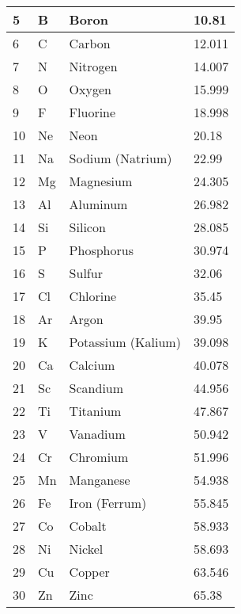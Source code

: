 \documentclass{article}
\begin{document}
\begin{center}
\begin{longtable}{|l|l|l|l|}
 \hline
    5 & B & \cellcolor{metalloid}Boron & 10.81\\
 \hline
    6 & C &\cellcolor{rnmgreen}Carbon & 12.011\\
 \hline
    7 & N &\cellcolor{rnmgreen}Nitrogen & 14.007\\
 \hline
    8 & O &\cellcolor{rnmgreen}Oxygen & 15.999\\
 \hline
    9 & F &\cellcolor{rnmgreen}Fluorine & 18.998\\
 \hline
    10 & Ne &\cellcolor{noblepink}Neon & 20.18\\
 \hline
 \hline
    11 & Na & \cellcolor{alkalibeige}Sodium (Natrium) & 22.99\\
 \hline
    12 & Mg &\cellcolor{alkalineyellow}Magnesium & 24.305\\
 \hline
    13 & Al & \cellcolor{postblue}Aluminum & 26.982\\
 \hline
    14 & Si & \cellcolor{metalloid}Silicon & 28.085\\
 \hline
    15 & P & \cellcolor{rnmgreen}Phosphorus & 30.974\\
 \hline
    16 & S & \cellcolor{rnmgreen}Sulfur & 32.06\\
 \hline
    17 & Cl & \cellcolor{rnmgreen}Chlorine & 35.45\\
 \hline
    18 & Ar &\cellcolor{noblepink}Argon & 39.95\\
 \hline
 \hline
    19 & K & \cellcolor{alkalibeige}Potassium (Kalium) & 39.098\\
 \hline
    20 & Ca & \cellcolor{alkalineyellow}Calcium & 40.078\\
 \hline
    21 & Sc & \cellcolor{transred}Scandium & 44.956\\
 \hline
    22 & Ti & \cellcolor{transred}Titanium & 47.867\\
 \hline
    23 & V & \cellcolor{transred}Vanadium & 50.942\\
 \hline
    24 & Cr & \cellcolor{transred}Chromium & 51.996\\
 \hline
    25 & Mn & \cellcolor{transred}Manganese & 54.938\\
 \hline
    26 & Fe & \cellcolor{transred}Iron (Ferrum) & 55.845\\
 \hline
    27 & Co & \cellcolor{transred}Cobalt & 58.933\\
 \hline
    28 & Ni & \cellcolor{transred}Nickel & 58.693\\
 \hline
    29 & Cu & \cellcolor{transred}Copper & 63.546\\
 \hline
    30 & Zn & \cellcolor{transred}Zinc & 65.38\\

\end{longtable}
\end{center}
\end{document}
